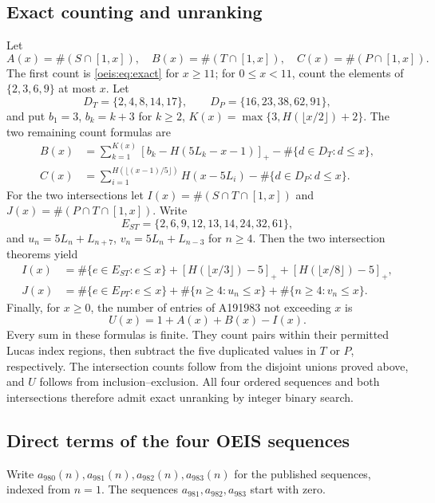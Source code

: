 \documentclass[11pt]{article}
\begin{document}
\subsection{Exact counting and unranking}
Let
\[
A(x)=\#(S\cap[1,x]),\quad
B(x)=\#(T\cap[1,x]),\quad
C(x)=\#(P\cap[1,x]).
\]
The first count is \eqref{oeis:eq:exact} for \(x\ge11\);
for \(0\le x<11\), count the elements of
\(\{2,3,6,9\}\) at most \(x\).
Let
\[
D_T=\{2,4,8,14,17\},\qquad
D_P=\{16,23,38,62,91\},
\]
and put \(b_1=3\), \(b_k=k+3\) for \(k\ge2\),
\(K(x)=\max\{3,H(\lfloor x/2\rfloor)+2\}\).
The two remaining count formulas are
\begin{align}
B(x)&=\sum_{k=1}^{K(x)}
[b_k-H(5L_k-x-1)]_+
-\#\{d\in D_T:d\le x\},\label{eq:oeis-Tcount}\\
C(x)&=\sum_{i=1}^{H(\lfloor(x-1)/5\rfloor)}
H(x-5L_i)
-\#\{d\in D_P:d\le x\}.\label{eq:oeis-Pcount}
\end{align}
For the two intersections let
\(I(x)=\#(S\cap T\cap[1,x])\) and
\(J(x)=\#(P\cap T\cap[1,x])\). Write
\[
E_{ST}=\{2,6,9,12,13,14,24,32,61\},
\]
and \(u_n=5L_n+L_{n+7}\),
\(v_n=5L_n+L_{n-3}\) for \(n\ge4\).
Then the two intersection theorems yield
\begin{align}
I(x)&=\#\{e\in E_{ST}:e\le x\}
+[H(\lfloor x/3\rfloor)-5]_+
+[H(\lfloor x/8\rfloor)-5]_+,\label{eq:oeis-Icount}\\
J(x)&=\#\{e\in E_{PT}:e\le x\}
+\#\{n\ge4:u_n\le x\}
+\#\{n\ge4:v_n\le x\}.
\label{eq:oeis-Jcount}
\end{align}
Finally, for \(x\ge0\), the number of entries
of A191983 not exceeding \(x\) is
\begin{equation}\label{eq:oeis-Ucount}
\boxed{\,U(x)=1+A(x)+B(x)-I(x).\,}
\end{equation}
Every sum in these formulas is finite.
They count pairs within their permitted Lucas
index regions, then subtract the five duplicated
values in \(T\) or \(P\), respectively.
The intersection counts follow from the disjoint
unions proved above, and \(U\) follows from
inclusion--exclusion. All four ordered sequences
and both intersections therefore admit exact
unranking by integer binary search.

\subsection{Direct terms of the four OEIS sequences}
Write \(a_{980}(n),a_{981}(n),a_{982}(n),a_{983}(n)\) for
the published sequences, indexed from \(n=1\).
The sequences \(a_{981},a_{982},a_{983}\) start with zero.
\end{document}
